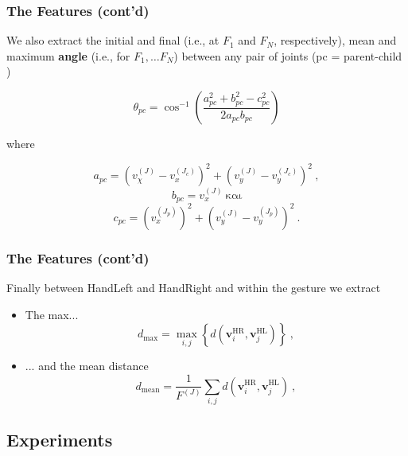 \begin{frame}
\frametitle{The Features (cont'd)}
We also extract the initial and final (i.e., at $F_1$ and $F_N$, respectively), mean and maximum \textbf{angle} (i.e., for $F_1,\ldots F_N$) between any pair of joints (pc = parent-child )

\begin{equation} \label{eq:1}
\theta_{pc} = \cos^{-1}\left(\frac{a_{pc}^2+b_{pc}^2-c_{pc}^2}{2a_{pc}b_{pc}}\right)
\end{equation}

\noindent where

\begin{equation}
a_{pc} = \left(v^{(J)}_χ - v^{(J_c)}_x\right)^2 + \left(v^{(J)}_y - v^{(J_c)}_y\right)^2  \ ,
\end{equation}
\begin{equation}
b_{pc} = v^{(J)}_x \ \text{και}
\end{equation}
\begin{equation}
c_{pc} = (v^{(J_p)}_x)^2 + (v^{(J)}_y - v^{(J_p)}_y)^2  \ .
\end{equation}

\end{frame}

\begin{frame}
\frametitle{The Features (cont'd)}
Finally between HandLeft and HandRight and within the gesture we extract

\begin{itemize}
\item The max...
\begin{equation}
\label{eq:maxd}
d_{\text{max}}=\max_{i,j} \left \{d\left(\mathbf{v}_i^{\text{HR}},\mathbf{v}_j^{\text{HL}}\right) \right \} \ ,
\end{equation}
\item ... and the mean distance
\begin{equation}
\label{eq:meand}   
d_{\text{mean}}= \frac{1}{F^{(J)}} \sum_{i,j} d\left(\mathbf{v}_i^{\text{HR}},\mathbf{v}_j^{\text{HL}}\right) \ ,
\end{equation}
\end{itemize}

\end{frame}

\subsection{Experiments}

